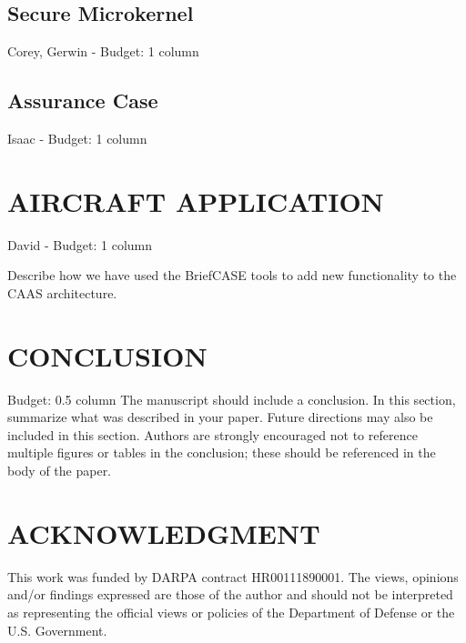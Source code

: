 \documentclass{IEEEcsmag}
\begin{document}


\subsection{Secure Microkernel}
Corey, Gerwin -  Budget: 1 column
\cite{sel4-formal}

\subsection{Assurance Case}
Isaac -  Budget: 1 column
\cite{resolute-destion}



\section{AIRCRAFT APPLICATION}
David -  Budget: 1 column

Describe how we have used the BriefCASE tools to add new functionality to the CAAS architecture.  

\section{CONCLUSION}
 Budget: 0.5 column
The manuscript should include a conclusion. In this section, summarize what was described in your paper. Future directions may also be included in this section. Authors are strongly encouraged not to reference multiple figures or tables in the conclusion; these should be referenced in the body of the paper.

\section{ACKNOWLEDGMENT}

This work was funded by DARPA contract HR00111890001. The
views, opinions and/or findings expressed are those of the author
and should not be interpreted as representing the official views or
policies of the Department of Defense or the U.S. Government.





\end{document}
